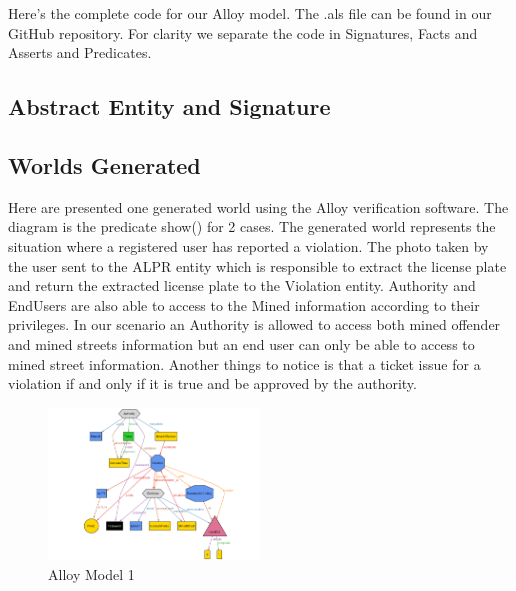 Here’s the complete code for our Alloy model. The .als file can be found in our
GitHub repository. For clarity we separate the code in Signatures, Facts and
Asserts and Predicates.

\subsection{Abstract Entity and Signature}



\subsection{Worlds Generated}
Here are presented one generated world using the Alloy veriﬁcation software. The diagram is the predicate show() for 2 cases.
The generated world represents the situation where a registered user has reported a violation. The photo taken by the user sent to the ALPR entity which is responsible to extract the license plate and return the extracted license plate to the Violation entity. Authority and EndUsers are also able to access to the Mined information according to their privileges. In our scenario an Authority is allowed to access both mined offender and mined streets information but an end user can only be able to access to mined street information. Another things to notice is that a ticket issue for a violation if and only if it is true and be approved by the authority.

\begin{figure}[H]
		\centering
      \includegraphics[width=0.5\textwidth]{Images/alloy.PNG}
      \caption{Alloy Model 1}   \label{fig:alloy}
\end{figure}
